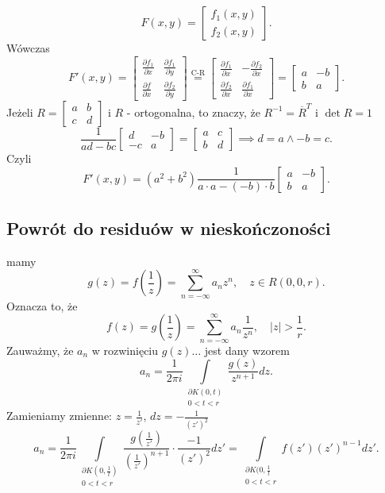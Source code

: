 \documentclass[../main.tex]{subfiles}
\begin{document}
\[
    F(x,y) = \begin{bmatrix} f_1(x,y)\\ f_2(x,y) \end{bmatrix}
.\]
Wówczas
\[
    F'(x,y) = \begin{bmatrix} \frac{\partial f_1}{\partial x} & \frac{\partial f_1}{\partial y} \\ \frac{\partial f}{\partial x} & \frac{\partial f_2}{\partial y}  \end{bmatrix} \overset{\text{C-R}}{=} \begin{bmatrix} \frac{\partial f_1}{\partial x} &-\frac{\partial f_2}{\partial x} \\\frac{\partial f_2}{\partial x} &\frac{\partial f_1}{\partial x}  \end{bmatrix} = \begin{bmatrix} a&-b\\b&a \end{bmatrix}
.\]
Jeżeli $R = \begin{bmatrix} a&b\\c&d \end{bmatrix} $ i $R$ - ortogonalna, to znaczy, że $R^{-1} = \overline{R}^{T}$ i $\det R = 1$
     \[
         \frac{1}{ad - bc}\begin{bmatrix} d&-b\\ -c&a \end{bmatrix} = \begin{bmatrix} a&c\\b&d \end{bmatrix} \implies d = a \land -b = c
    .\]
Czyli
\[
    F'(x,y) = (a^2 + b^2)\frac{1}{a\cdot a - (-b)\cdot b}\begin{bmatrix} a&-b\\b&a \end{bmatrix}
.\]
\subsection{Powrót do residuów w nieskończoności}
mamy
\[
    g(z) = f\left(\frac{1}{z}\right) = \sum_{n=-\infty}^{\infty} a_n z^n,\quad z\in R(0,0,r)
.\]
Oznacza to, że
\[
    f(z) = g\left( \frac{1}{z} \right) = \sum_{n=-\infty}^{\infty} a_n \frac{1}{z^n},\quad |z| > \frac{1}{r}
.\]
Zauważmy, że $a_n$ w rozwinięciu $g(z)\ldots$ jest dany wzorem
\[
    a_n = \frac{1}{2\pi i} \int\limits_{\substack{\partial K(0,t)\\ 0 < t < r}} \frac{g(z)}{z^{n+1}}dz
.\]
Zamieniamy zmienne: $z = \frac{1}{z'}$, $dz = -\frac{1}{(z')^2}$
 \[
     a_n = \frac{1}{2\pi i} \int\limits_{\substack{\partial K\left(0,\frac{1}{t}\right)\\ 0 < t < r}} \frac{g\left( \frac{1}{z'} \right) }{\left( \frac{1}{z'} \right) ^{n+1}}\cdot \frac{-1}{(z')^2}dz' = \int\limits_{\substack{\partial K(0,\frac{1}{t}\\ 0 < t < r}}f(z')(z')^{n-1}dz'
 .\]
\end{document}
